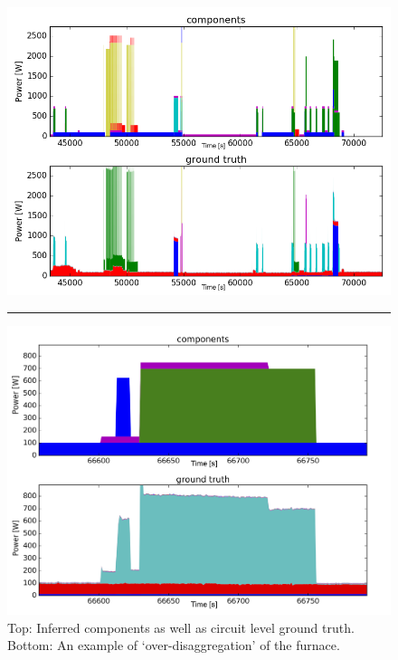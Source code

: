 \begin{figure}[!h]
\centering
\includegraphics[width=0.8\linewidth]{varbolt/aggregate.png}\\
\rule{0.5\linewidth}{0.4pt}
\includegraphics[width=0.8\linewidth]{varbolt/furnace.png}
\caption[VarBOLT: Disaggregation performance and an example of `over-disaggregation'.]{\label{furnace} Top: Inferred components as well as circuit level ground truth. Bottom: An example of `over-disaggregation' of the furnace.}
\end{figure}

